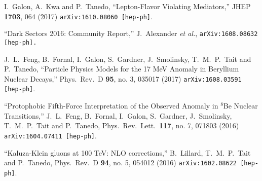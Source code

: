 \documentclass[margin,line]{resume}
\begin{document}
\begin{resume}
    
  I.~Galon, A.~Kwa and P.~Tanedo,
  ``Lepton-Flavor Violating Mediators,''
  JHEP {\bf 1703}, 064 (2017)
  \texttt{arXiv:1610.08060 [hep-ph]}.
	\vspace{-2mm}
  
``Dark Sectors 2016:%
 Community Report,'' 
  J.~Alexander {\it et al.},
  \texttt{arXiv:1608.08632 [hep-ph].}
  \vspace{-2mm}

  J.~L.~Feng, B.~Fornal, I.~Galon, S.~Gardner, J.~Smolinsky, T.~M.~P.~Tait and P.~Tanedo,
``Particle Physics Models for the 17 MeV Anomaly in Beryllium Nuclear Decays,''
  Phys.\ Rev.\ D {\bf 95}, no. 3, 035017 (2017)
  \texttt{arXiv:1608.03591 [hep-ph]}.
    \vspace{-2mm}
  
``Protophobic Fifth-Force Interpretation of the Observed Anomaly in $^8$Be Nuclear Transitions,''  
J.~L.~Feng, B.~Fornal, I.~Galon, S.~Gardner, J.~Smolinsky, T.~M.~P.~Tait and P.~Tanedo,
  Phys.\ Rev.\ Lett.\  {\bf 117}, no. 7, 071803 (2016)
  \texttt{arXiv:1604.07411 [hep-ph]}.
  \vspace{-2mm}
  
  ``Kaluza-Klein gluons at 100 TeV: NLO corrections,''
  B.~Lillard, T.~M.~P.~Tait and P.~Tanedo,
  Phys.\ Rev.\ D {\bf 94}, no. 5, 054012 (2016)
  \texttt{arXiv:1602.08622 [hep-ph]}.
  \vspace{-2mm}


\end{resume}
\end{document}

